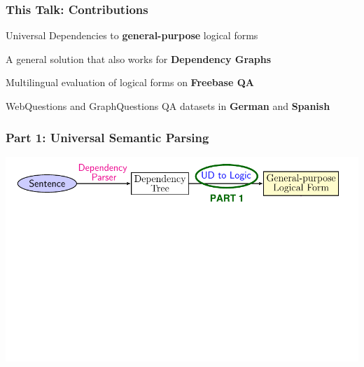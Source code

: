 \documentclass[mathserif,12pt]{beamer}
\begin{document}
\begin{frame}
\end{frame}

\begin{frame}
 \frametitle{This Talk: Contributions}
 \large 

Universal Dependencies to \textbf{general-purpose} logical forms

\vspace{1em}
A general solution that also works for \textbf{Dependency Graphs}

\vspace{1em}
Multilingual evaluation of logical forms on \textbf{Freebase QA}

\vspace{1em}
WebQuestions and GraphQuestions QA datasets in \textbf{German} and \textbf{Spanish}
\end{frame}

\begin{frame}
\frametitle{Part 1: Universal Semantic Parsing}
\vspace{4em}
\includegraphics[scale=0.82]{figures/outline7.pdf}
\end{frame}
\end{document}
